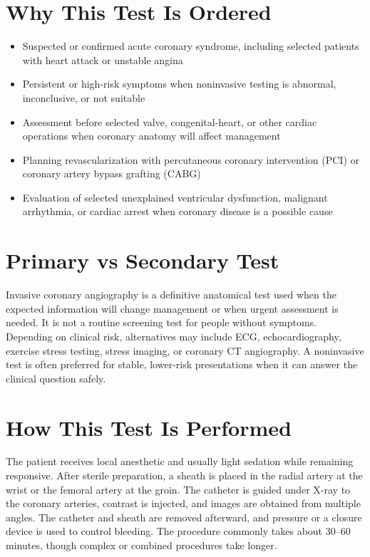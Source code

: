 \section*{Why This Test Is Ordered}
\begin{itemize}
  \item Suspected or confirmed acute coronary syndrome, including selected patients with heart attack or unstable angina
  \item Persistent or high-risk symptoms when noninvasive testing is abnormal, inconclusive, or not suitable
  \item Assessment before selected valve, congenital-heart, or other cardiac operations when coronary anatomy will affect management
  \item Planning revascularization with percutaneous coronary intervention (PCI) or coronary artery bypass grafting (CABG)
  \item Evaluation of selected unexplained ventricular dysfunction, malignant arrhythmia, or cardiac arrest when coronary disease is a possible cause
\end{itemize}

\section*{Primary vs Secondary Test}
Invasive coronary angiography is a definitive anatomical test used when the expected information will change management or when urgent assessment is needed. It is not a routine screening test for people without symptoms. Depending on clinical risk, alternatives may include ECG, echocardiography, exercise stress testing, stress imaging, or coronary CT angiography. A noninvasive test is often preferred for stable, lower-risk presentations when it can answer the clinical question safely.

\section*{How This Test Is Performed}
The patient receives local anesthetic and usually light sedation while remaining responsive. After sterile preparation, a sheath is placed in the radial artery at the wrist or the femoral artery at the groin. The catheter is guided under X-ray to the coronary arteries, contrast is injected, and images are obtained from multiple angles. The catheter and sheath are removed afterward, and pressure or a closure device is used to control bleeding. The procedure commonly takes about 30--60 minutes, though complex or combined procedures take longer.

